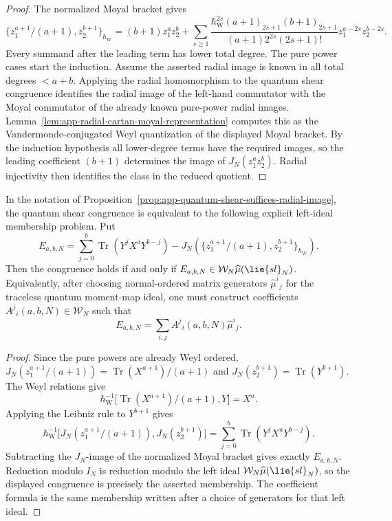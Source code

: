 \begin{proof}
  The normalized Moyal bracket gives
  \[
    \{z_1^{a+1}/(a+1),z_2^{b+1}\}_{\hbar_{\mathrm{W}}}
    =
    (b+1)z_1^az_2^b
    +\sum_{s\ge1}
      \frac{\hbar_{\mathrm{W}}^{2s}(a+1)_{2s+1}(b+1)_{2s+1}}
      {(a+1)2^{2s}(2s+1)!}
      z_1^{a-2s}z_2^{b-2s}.
  \]
  Every summand after the leading term has lower total degree.  The pure
  power cases start the induction.  Assume the asserted radial image is
  known in all total degrees \(<a+b\).  Applying the radial homomorphism
  to the quantum shear congruence identifies the radial image of the
  left-hand commutator with the Moyal commutator of the already known
  pure-power radial images.  Lemma~\ref{lem:app-radial-cartan-moyal-representation}
  computes this as the Vandermonde-conjugated Weyl quantization of the
  displayed Moyal bracket.  By the induction hypothesis all lower-degree
  terms have the required images, so the leading coefficient
  \((b+1)\) determines the image of \(J_N(z_1^az_2^b)\).  Radial
  injectivity then identifies the class in the reduced quotient.
\end{proof}

\begin{lem}
\label{lem:app-quantum-shear-primitive-obstruction}
  In the notation of
  Proposition~\ref{prop:app-quantum-shear-suffices-radial-image}, the
  quantum shear congruence is equivalent to the following explicit
  left-ideal membership problem.  Put
  \[
    E_{a,b,N}
    =
    \sum_{j=0}^b\operatorname{Tr}(Y^jX^aY^{b-j})
    -
    J_N\!\left(
      \{z_1^{a+1}/(a+1),z_2^{b+1}\}_{\hbar_{\mathrm{W}}}
    \right).
  \]
  Then the congruence holds if and only if
  \(E_{a,b,N}\in\mathcal W_N\widehat\mu(\lie{sl}_N)\).  Equivalently,
  after choosing normal-ordered matrix generators
  \(\widehat\mu^i{}_j\) for the traceless quantum moment-map ideal, one
  must construct coefficients \(A^j{}_i(a,b,N)\in\mathcal W_N\) such
  that
  \[
    E_{a,b,N}=\sum_{i,j}A^j{}_i(a,b,N)\widehat\mu^i{}_j .
  \]
\end{lem}

\begin{proof}
  Since the pure powers are already Weyl ordered,
  \(J_N(z_1^{a+1}/(a+1))=\operatorname{Tr}(X^{a+1})/(a+1)\) and
  \(J_N(z_2^{b+1})=\operatorname{Tr}(Y^{b+1})\).  The Weyl relations give
  \[
    \hbar_{\mathrm{W}}^{-1}
    \bigl[\operatorname{Tr}(X^{a+1})/(a+1),Y\bigr]
    =X^a .
  \]
  Applying the Leibniz rule to \(Y^{b+1}\) gives
  \[
    \hbar_{\mathrm{W}}^{-1}
    \bigl[
      J_N(z_1^{a+1}/(a+1)),J_N(z_2^{b+1})
    \bigr]
    =
    \sum_{j=0}^b\operatorname{Tr}(Y^jX^aY^{b-j}).
  \]
  Subtracting the \(J_N\)-image of the normalized Moyal bracket gives
  exactly \(E_{a,b,N}\).  Reduction modulo \(I_N\) is reduction modulo
  the left ideal
  \(\mathcal W_N\widehat\mu(\lie{sl}_N)\), so the displayed congruence
  is precisely the asserted membership.  The coefficient formula is the
  same membership written after a choice of generators for that left
  ideal.
\end{proof}

